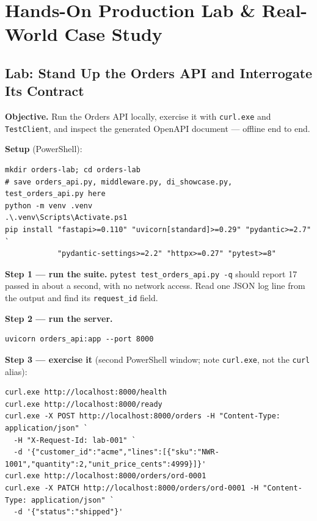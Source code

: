 \section{Hands-On Production Lab \& Real-World Case Study}
\label{sec:ch6-lab}

\subsection{Lab: Stand Up the Orders API and Interrogate Its Contract}
\label{sec:ch6-lab-run}

\textbf{Objective.} Run the Orders API locally, exercise it with
\texttt{curl.exe} and \texttt{TestClient}, and inspect the generated OpenAPI
document --- offline end to end.

\textbf{Setup} (PowerShell):

\begin{verbatim}
mkdir orders-lab; cd orders-lab
# save orders_api.py, middleware.py, di_showcase.py, test_orders_api.py here
python -m venv .venv
.\.venv\Scripts\Activate.ps1
pip install "fastapi>=0.110" "uvicorn[standard]>=0.29" "pydantic>=2.7" `
            "pydantic-settings>=2.2" "httpx>=0.27" "pytest>=8"
\end{verbatim}

\textbf{Step 1 --- run the suite.} \texttt{pytest test\_orders\_api.py -q}
should report 17 passed in about a second, with no network access. Read one
JSON log line from the output and find its \texttt{request\_id} field.

\textbf{Step 2 --- run the server.}

\begin{verbatim}
uvicorn orders_api:app --port 8000
\end{verbatim}

\textbf{Step 3 --- exercise it} (second PowerShell window; note
\texttt{curl.exe}, not the \texttt{curl} alias):

\begin{verbatim}
curl.exe http://localhost:8000/health
curl.exe http://localhost:8000/ready
curl.exe -X POST http://localhost:8000/orders -H "Content-Type: application/json" `
  -H "X-Request-Id: lab-001" `
  -d '{"customer_id":"acme","lines":[{"sku":"NWR-1001","quantity":2,"unit_price_cents":4999}]}'
curl.exe http://localhost:8000/orders/ord-0001
curl.exe -X PATCH http://localhost:8000/orders/ord-0001 -H "Content-Type: application/json" `
  -d '{"status":"shipped"}'
\end{verbatim}

